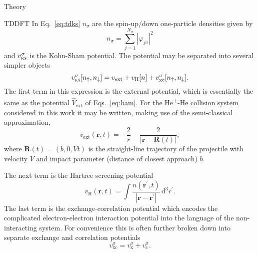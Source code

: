 \documentclass[aps, pra, reprint, groupedaddress, amsfonts,
               amsmath, amssymb, showpacs, nofootinbib]{revtex4-1}
\begin{document}
\begin{section}{Theory \label{sec:theory}}
\begin{subsection}{TDDFT \label{sec:tddft}}
      In Eq.~\eqref{eq:tdks} $n_\sigma$ are the spin-up/down one-particle densities given by
      \begin{equation} \label{eq:spinden}
         n_\sigma = \sum\limits_{j=1}^{N_\sigma} \left| \varphi_{j\sigma} \right|^2
      \end{equation}
      and $v^\sigma_\textsc{ks}$ is the Kohn-Sham potential. The potential may be separated into several
      simpler objects
      \begin{equation} \label{eq:vks}
         v^\sigma_\mathrm{\textsc{ks}}[n_\uparrow, n_\downarrow] = v_\mathrm{ext} + v_\mathrm{H}[n]
                                                   + v^\sigma_\mathrm{xc}[n_\uparrow, n_\downarrow].
      \end{equation}
      The first term in this expression is the external potential, which is essentially the same as the
      potential $\hat{V}_\mathrm{ext}$ of Eqs.~\eqref{eq:ham}. For the He\textsuperscript{+}-He
      collision system considered in this work it may be written, making use of the semi-classical
      approximation,
      \begin{equation} \label{eq:hephe-ext}
         v_\mathrm{ext}(\mathbf{r},t) = -\frac{2}{r} 
         - \frac{2}{\left| \mathbf{r} - \mathbf{R}(t) \right|},
      \end{equation}
      where $\mathbf{R}(t) = (b,0,V t)$ is the straight-line trajectory of the projectile with velocity
      $V$ and impact parameter (distance of closest approach) $b$.
      
      The next term is the Hartree screening potential
      \begin{equation} \label{eq:vh}
         v_\mathrm{H}(\mathbf{r},t) = \int \frac{n(\mathbf{r}^\prime, t)}
            {\left| \mathbf{r} - \mathbf{r}^\prime\right|} \, \mathrm{d}^3 r^\prime.
      \end{equation}
      The last term is the exchange-correlation potential which encodes the complicated
      electron-electron interaction potential into the language of the non-interacting system. For
      convenience this is often further broken down into separate exchange and correlation potentials
      \begin{equation} \label{eq:vxc}
         v^\sigma_\mathrm{xc} = v^\sigma_\mathrm{x} + v^\sigma_\mathrm{c}.
      \end{equation}


\end{subsection}
\end{section}
\end{document}
